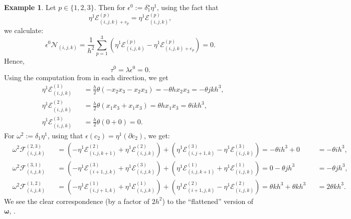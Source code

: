 \documentclass[fleqn]{article}
\theoremstyle{definition}
\newtheorem{example}[theorem]{Example}
\begin{document}
\begin{example}
  Let $p \in \{1, 2, 3\}$.
  Then for $\epsilon^0 := \delta_1^\star \eta^1$, using the fact that
  \begin{equation}
    \eta^1 \mathcal{E}^{(p)}_{(i, j, k) + e_p} =
    \eta^1 \mathcal{E}^{(p)}_{(i, j, k)},
  \end{equation}
  we calculate:
  \begin{equation}
    \epsilon^0 \mathcal{N}_{(i, j, k)}
    =
      \frac{1}{h^2}
      \sum_{p = 1}^3 (
          \eta^1 \mathcal{E}^{(p)}_{(i, j, k)}
        - \eta^1 \mathcal{E}^{(p)}_{(i, j, k) + e_p}
      )
    = 0.
  \end{equation}
  Hence,
  \begin{equation}
    \tau^0 = \lambda \epsilon^0 = 0.
  \end{equation} 
  Using the computation from
  in each direction, we get
  \begin{subequations}
    \begin{alignat}{2}
      & \eta^1 \mathcal{E}^{(1)}_{(i, j, k)} && 
        = \frac{h}{2} \theta (-x_2 x_3 - x_2 x_3)
        = - \theta h x_2 x_3
        = - \theta j k h^3, \\
      & \eta^1 \mathcal{E}^{(2)}_{(i, j, k)} && 
        = \frac{h}{2} \theta (x_1 x_3 + x_1 x_3)
        = \theta h x_1 x_3
        = \theta i k h^3, \\
      & \eta^1 \mathcal{E}^{(3)}_{(i, j, k)} && 
        = \frac{h}{2} \theta (0 + 0)
        = 0.
    \end{alignat}
  \end{subequations}
  For $\omega^2 := \delta_1 \eta^1$, using that
  $\epsilon(c_2) = \eta^1(\partial c_2)$, we get:
  \begin{subequations}
    \begin{alignat}{3}
      & \omega^2 \mathcal{F}^{(2, 3)}_{(i, j, k)}
      && =
        ( - \eta^1 \mathcal{E}^{(2)}_{(i, j, k + 1)}
          + \eta^1 \mathcal{E}^{(2)}_{(i, j, k)}
        )
      + ( \eta^1 \mathcal{E}^{(3)}_{(i, j + 1, k)}
          - \eta^1 \mathcal{E}^{(3)}_{(i, j, k)}
        )
      = - \theta i h^3 + 0
      && = - \theta i h^3, \\
%
      & \omega^2 \mathcal{F}^{(3, 1)}_{(i, j, k)}
      && = 
        ( - \eta^1 \mathcal{E}^{(3)}_{(i + 1, j, k)}
          + \eta^1 \mathcal{E}^{(3)}_{(i, j, k)}
        )
      + ( \eta^1 \mathcal{E}^{(1)}_{(i, j, k + 1)}
          + \eta^1 \mathcal{E}^{(1)}_{(i, j, k)}
        )
      = 0 - \theta j h^3
      && = - \theta j h^3, \\
%
      & \omega^2 \mathcal{F}^{(1, 2)}_{(i, j, k)}
      && = 
        ( - \eta^1 \mathcal{E}^{(1)}_{(i, j + 1, k)}
          + \eta^1 \mathcal{E}^{(1)}_{(i, j, k)}
        )
      + ( \eta^1 \mathcal{E}^{(2)}_{(i + 1, j, k)}
          - \eta^1 \mathcal{E}^{(2)}_{(i, j, k)}
        )
      = \theta k h^3 + \theta k h^3
      && = 2 \theta k h^3.
    \end{alignat}
  \end{subequations}
  We see the clear correspondence (by a factor of $2 h^2$) to the ``flattened''
  version of $\boldsymbol{\omega}$,
  . 
  

\end{example}
\end{document}
